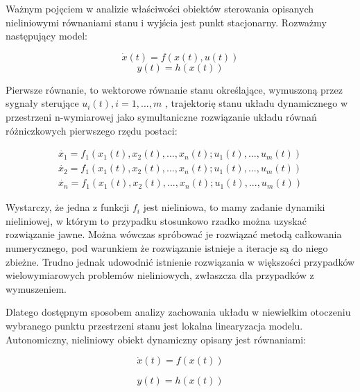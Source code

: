 \documentclass{article}
\begin{document}
	\maketitle
	Ważnym pojęciem w analizie właściwości obiektów sterowania opisanych nieliniowymi
	równaniami stanu i wyjścia jest punkt stacjonarny. Rozważmy następujący model:

	\begin{equation}
		\dot{x}(t) = f(x(t), u(t))
	\end{equation}
	\begin{equation}
		y(t) = h(x(t))
	\end{equation}

	Pierwsze równanie, to wektorowe równanie stanu określające, wymuszoną przez
	sygnały sterujące { $ u_i(t), i=1,...,m $ }, trajektorię stanu układu dynamicznego w przestrzeni
	n-wymiarowej jako symultaniczne rozwiązanie układu równań różniczkowych pierwszego rzędu postaci:

	\begin{equation}
		\begin{aligned}
			\dot{x_1} = f_1(x_1(t), x_2(t),...,x_n(t); u_1(t),...,u_m(t)) \\
			\dot{x_2} = f_1(x_1(t), x_2(t),...,x_n(t); u_1(t),...,u_m(t)) \\
			\dot{x_n} = f_1(x_1(t), x_2(t),...,x_n(t); u_1(t),...,u_m(t))
		\end{aligned}
	\end{equation}

	Wystarczy, że jedna z funkcji $f_i$ jest nieliniowa, to mamy zadanie dynamiki nieliniowej, w
	którym to przypadku stosunkowo rzadko można uzyskać rozwiązanie jawne. Można
	wówczas spróbować je rozwiązać metodą całkowania numerycznego, pod warunkiem że
	rozwiązanie istnieje a iteracje są do niego zbieżne. Trudno jednak udowodnić istnienie
	rozwiązania w większości przypadków wielowymiarowych problemów nieliniowych,
	zwłaszcza dla przypadków z wymuszeniem.

	Dlatego dostępnym sposobem analizy zachowania układu w niewielkim otoczeniu
	wybranego punktu przestrzeni stanu jest lokalna linearyzacja modelu. Autonomiczny,
	nieliniowy obiekt dynamiczny opisany jest równaniami:

	\begin{equation}
		\dot{x}(t) = f(x(t))
	\end{equation}

	\begin{equation}
		y(t) = h(x(t))
	\end{equation}
\end{document}
